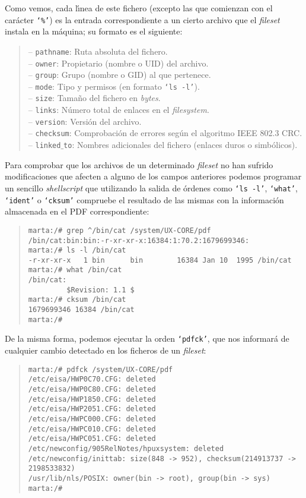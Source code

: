 Como vemos, cada l\'{\i}nea de este fichero (excepto las que comienzan con el
car\'acter {\tt `\%'}) es la entrada correspondiente a un cierto archivo que
el {\it fileset} instala en la m\'aquina; su formato es el siguiente:
\begin{quote}
-- {\tt pathname}: Ruta absoluta del fichero.\\
-- {\tt owner}: Propietario (nombre o UID) del archivo.\\
-- {\tt group}: Grupo (nombre o GID) al que pertenece.\\
-- {\tt mode}: Tipo y permisos (en formato {\tt `ls -l'}).\\
-- {\tt size}: Tama\~no del fichero en {\it bytes}.\\
-- {\tt links}: N\'umero total de enlaces en el {\it filesystem}.\\
-- {\tt version}: Versi\'on del archivo.\\
-- {\tt checksum}: Comprobaci\'on de errores seg\'un el algoritmo IEEE 802.3 
CRC.\\
-- {\tt linked$\_$to}: Nombres adicionales del fichero (enlaces duros o 
simb\'olicos).
\end{quote}
Para comprobar que los archivos de un determinado {\it fileset} no han sufrido
modificaciones que afecten a alguno de los campos anteriores podemos 
programar un sencillo {\it shellscript} que utilizando la salida de \'ordenes 
como {\tt `ls -l'}, {\tt `what'}, {\tt `ident'} o {\tt `cksum'} compruebe el
resultado de las mismas con la informaci\'on almacenada en el PDF 
correspondiente:
\begin{quote}
\begin{verbatim}
marta:/# grep ^/bin/cat /system/UX-CORE/pdf
/bin/cat:bin:bin:-r-xr-xr-x:16384:1:70.2:1679699346:
marta:/# ls -l /bin/cat
-r-xr-xr-x   1 bin      bin        16384 Jan 10  1995 /bin/cat
marta:/# what /bin/cat
/bin/cat:
         $Revision: 1.1 $
marta:/# cksum /bin/cat
1679699346 16384 /bin/cat 
marta:/# 
\end{verbatim}
\end{quote}
De la misma forma, podemos ejecutar la orden {\tt `pdfck'},  que nos informar\'a
de cualquier cambio detectado en los ficheros de un {\it fileset}:
\begin{quote}
\begin{verbatim}
marta:/# pdfck /system/UX-CORE/pdf
/etc/eisa/HWP0C70.CFG: deleted
/etc/eisa/HWP0C80.CFG: deleted
/etc/eisa/HWP1850.CFG: deleted
/etc/eisa/HWP2051.CFG: deleted
/etc/eisa/HWPC000.CFG: deleted
/etc/eisa/HWPC010.CFG: deleted
/etc/eisa/HWPC051.CFG: deleted
/etc/newconfig/905RelNotes/hpuxsystem: deleted
/etc/newconfig/inittab: size(848 -> 952), checksum(214913737 -> 2198533832)
/usr/lib/nls/POSIX: owner(bin -> root), group(bin -> sys)
marta:/# 
\end{verbatim}
\end{quote}
